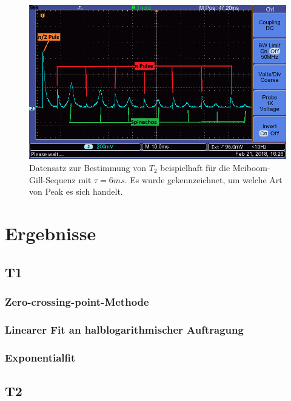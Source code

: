 \documentclass[12pt,a4paper]{article}
\begin{document}
\begin{figure}
\centering
\includegraphics[scale=0.8]{Bilder/T2Beispiel.png}
\caption{Datensatz zur Bestimmung von $T_2$ beispielhaft für die Meiboom-Gill-Sequenz mit $\tau = 6ms$. Es wurde gekennzeichnet, um welche Art von Peak es sich handelt. }
\label{fig:T2Beispiel}
\end{figure}

\section{Ergebnisse}

\subsection{T1}
\subsubsection{Zero-crossing-point-Methode}
\subsubsection{Linearer Fit an halblogarithmischer Auftragung}
\subsubsection{Exponentialfit}



\subsection{T2}
\end{document}
